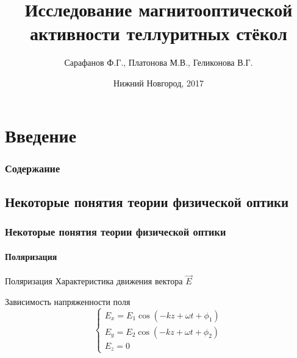 \documentclass[12pt,pdf,hyperref={unicode}, dvipsnames]{beamer}
\begin{document}
 

\title[Магнитооптическая активность теллуритных стёкол]{Исследование магнитооптической активности теллуритных стёкол} 
\author{Сарафанов Ф.Г., Платонова М.В., Геликонова В.Г. }
\date{Нижний Новгород, 2017} 
\frame{\titlepage} 

\section{Введение}

\begin{frame}[t]
  \frametitle{Содержание}
  \tableofcontents
\end{frame}

\subsection{Некоторые понятия теории физической оптики}

\begin{frame}[t]
  \frametitle{Некоторые понятия теории физической оптики}
  \framesubtitle{Поляризация}
 \begin{block}{Поляризация}
Характеристика движения вектора $\vec{E}$
\end{block}
Зависимость напряженности поля
\begin{equation}
\begin{cases} 
E_x = E_1\cos\left(-kz+\omega t+ \phi_1\right)\\
E_y = E_2\cos\left(-kz+\omega t+ \phi_2\right)\\
E_z = 0
\end{cases}  	
\end{equation}
\end{frame}
\end{document}
